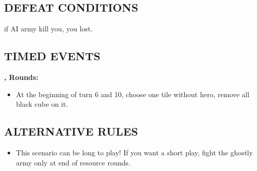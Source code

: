 \begin{multicols*}{2}
\subsection*{\MakeUppercase{Defeat Conditions}}

if AI army kill you, you lost.

\subsection*{\MakeUppercase{Timed Events}}

\textbf{,  Rounds:}
\begin{itemize}
  \item At the beginning of turn 6 and 10, choose one tile without hero, remove all black cube on it.
\end{itemize}


\subsection*{\MakeUppercase{Alternative Rules}}
\begin{itemize}
    \item This scenario can be long to play! If you want a short play, fight the ghostly army only at end of resource rounds.
\end{itemize}


\end{multicols*}
